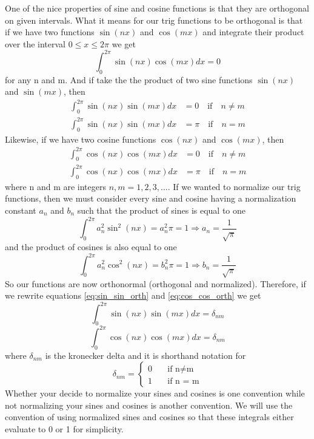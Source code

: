 \documentclass{article}
\newcommand{\be}{\begin{equation}}
\newcommand{\ee}{\end{equation}}
\begin{document}
One of the nice properties of sine and cosine functions is that they are orthogonal on given intervals.
What it means for our trig functions to be orthogonal is that if we have two functions $\sin(nx)$ and $\cos(mx)$ and integrate their product over the interval $0 \leq x \leq 2 \pi$ we get
\be \label{eq:sin_cos}
  \int_0^{2\pi} \sin(nx)\cos(mx) dx = 0
\ee
for any n and m.
And if take the the product of two sine functions $\sin(nx)$ and $\sin(mx)$, then
\be \label{eq:sin_sin_orth}
  \begin{split}
    \int_0^{2\pi} \sin(nx)\sin(mx) dx &= 0 \quad \text{if} \quad n \neq m \\
    \int_0^{2\pi} \sin(nx)\sin(mx) dx &= \pi \quad \text{if} \quad n = m
  \end{split}
\ee
Likewise, if we have two cosine functions $\cos(nx)$ and $\cos(mx)$, then
\be \label{eq:cos_cos_orth}
  \begin{split}
    \int_0^{2\pi} \cos(nx)\cos(mx) dx &= 0 \quad \text{if} \quad n \neq m \\
    \int_0^{2\pi} \cos(nx)\cos(mx) dx &= \pi \quad \text{if} \quad n = m
  \end{split}
\ee
where n and m are integers $n,m = 1, 2, 3, \hdots$.
If we wanted to normalize our trig functions, then we must consider every sine and cosine having a normalization constant $a_n$ and $b_n$ such that the product of sines is equal to one
\be \label{eq:sin_sin_norm_norm}
  \int_0^{2\pi} a_n^2 \sin^2(nx) = a_n^2\pi = 1 \Rightarrow a_n = \frac{1}{\sqrt{\pi}}
\ee
and the product of cosines is also equal to one
\be \label{eq:cos_cos_norm_norm}
  \int_0^{2\pi} a_n^2 \cos^2(nx) = b_n^2\pi = 1 \Rightarrow b_n = \frac{1}{\sqrt{\pi}}
\ee
So our functions are now orthonormal (orthogonal and normalized).
Therefore, if we rewrite equations \ref{eq:sin_sin_orth} and \ref{eq:cos_cos_orth} we get
\be \label{eq:sin_sin_orthonorm}
  \int_0^{2\pi} \sin(nx)\sin(mx) dx = \delta_{nm}
\ee
\be \label{eq:cos_cos_orthonorm}
  \int_0^{2\pi} \cos(nx)\cos(mx) dx = \delta_{nm}
\ee
where $\delta_{nm}$ is the kronecker delta and it is shorthand notation for
\be
\delta_{nm} =
  \left\{
    \begin{array}{ll}
      0 & \quad \text{if n} \neq \text{m} \\
      1 & \quad \text{if n = m}
    \end{array}
  \right.
\ee
Whether your decide to normalize your sines and cosines is one convention while not normalizing your sines and cosines is another convention.
We will use the convention of using normalized sines and cosines so that these integrals either evaluate to 0 or 1 for simplicity.
\end{document}
